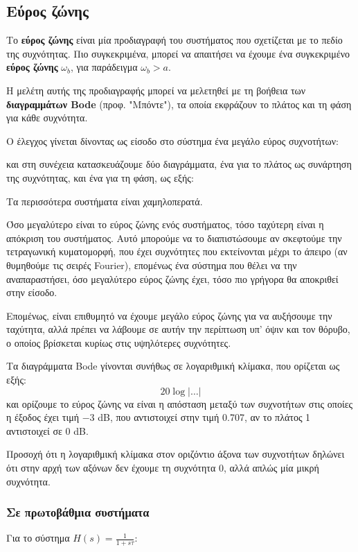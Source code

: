 \documentclass[11pt,a4paper,notitlepage,fleqn,draft]{article}
\begin{document}
\subsection{Εύρος ζώνης}
Το \textbf{εύρος ζώνης} είναι μία προδιαγραφή του συστήματος που σχετίζεται με το πεδίο
της συχνότητας. Πιο συγκεκριμένα, μπορεί να απαιτήσει να έχουμε ένα συγκεκριμένο
\textbf{εύρος ζώνης} \( \omega_b \), για παράδειγμα \( \omega_b > a \).

Η μελέτη αυτής της προδιαγραφής μπορεί να μελετηθεί με τη βοήθεια των
\textbf{διαγραμμάτων Bode} (προφ. "Μπόντε"), τα οποία εκφράζουν το πλάτος και τη φάση
για κάθε συχνότητα.

Ο έλεγχος γίνεται δίνοντας ως είσοδο στο σύστημα ένα μεγάλο εύρος συχνοτήτων:

και στη συνέχεια κατασκευάζουμε δύο διαγράμματα, ένα για το πλάτος ως συνάρτηση της
συχνότητας, και ένα για τη φάση, ως εξής:

Τα περισσότερα συστήματα είναι χαμηλοπερατά.

Όσο μεγαλύτερο είναι το εύρος ζώνης ενός συστήματος, τόσο ταχύτερη είναι η απόκριση του
συστήματος. Αυτό μπορούμε να το διαπιστώσουμε αν σκεφτούμε την τετραγωνική κυματομορφή,
που έχει συχνότητες που εκτείνονται μέχρι το άπειρο (αν θυμηθούμε τις σειρές Fourier),
επομένως ένα σύστημα που θέλει να την αναπαραστήσει, όσο μεγαλύτερο εύρος ζώνης έχει,
τόσο πιο γρήγορα θα αποκριθεί στην είσοδο.

Επομένως, είναι επιθυμητό να έχουμε μεγάλο εύρος ζώνης για να αυξήσουμε την ταχύτητα, αλλά
πρέπει να λάβουμε σε αυτήν την περίπτωση υπ' όψιν και τον θόρυβο, ο οποίος βρίσκεται κυρίως
στις υψηλότερες συχνότητες.

Τα διαγράμματα Bode γίνονται συνήθως σε λογαριθμική κλίμακα, που ορίζεται ως εξής:
\[
20\log|\dots|
\]
και ορίζουμε το εύρος ζώνης να είναι η απόσταση μεταξύ των συχνοτήτων στις οποίες η έξοδος
έχει τιμή \(-3\) dB, που αντιστοιχεί στην τιμή 0.707, αν το πλάτος 1 αντιστοιχεί σε 0 dB.

Προσοχή ότι η λογαριθμική κλίμακα στον οριζόντιο άξονα των συχνοτήτων δηλώνει ότι στην
αρχή των αξόνων δεν έχουμε τη συχνότητα 0, αλλά απλώς μία μικρή συχνότητα.

\subsubsection{Σε πρωτοβάθμια συστήματα}
Για το σύστημα \( \displaystyle H(s)=\frac{1}{1+sτ} \):
\end{document}

